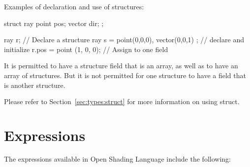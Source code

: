 \documentclass[11pt,letterpaper]{book}
\def\langname{Open Shading Language\xspace}
\begin{document}
Examples of declaration and use of structures:

\begin{code}
    struct ray {
        point pos;
        vector dir;
    };

    ray r;   // Declare a structure
    ray s = { point(0,0,0), vector(0,0,1) };  // declare and initialize
    r.pos = point (1, 0, 0);  // Assign to one field
\end{code}

It is permitted to have a structure field that is an array, as well as
to have an array of structures.  But it is not permitted for one
structure to have a field that is another structure.

Please refer to Section~\ref{sec:types:struct} for more information
on using {\cf struct}.


\section{Expressions}
\label{sec:expressions}

The expressions available in \langname include the following:
\end{document}

